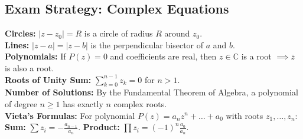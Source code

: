 \subsection{Exam Strategy: Complex Equations}
\textbf{Circles:} $|z - z_0| = R$ is a circle of radius $R$ around $z_0$. \\
\textbf{Lines:} $|z - a| = |z - b|$ is the perpendicular bisector of $a$ and $b$. \\
\textbf{Polynomials:} If $P(z)=0$ and coefficients are real, then $z \in \mathbb{C}$ is a root $\implies \bar{z}$ is also a root. \\
\textbf{Roots of Unity Sum:} $\sum_{k=0}^{n-1} z_k = 0$ for $n > 1$. \\
\textbf{Number of Solutions:} By the Fundamental Theorem of Algebra, a polynomial of degree $n \ge 1$ has exactly $n$ complex roots. \\
\textbf{Vieta's Formulas:} For polynomial $P(z) = a_n z^n + \dots + a_0$ with roots $z_1, \dots, z_n$: \textbf{Sum:} $\sum z_i = -\frac{a_{n-1}}{a_n}$. \textbf{Product:} $\prod z_i = (-1)^n \frac{a_0}{a_n}$.
